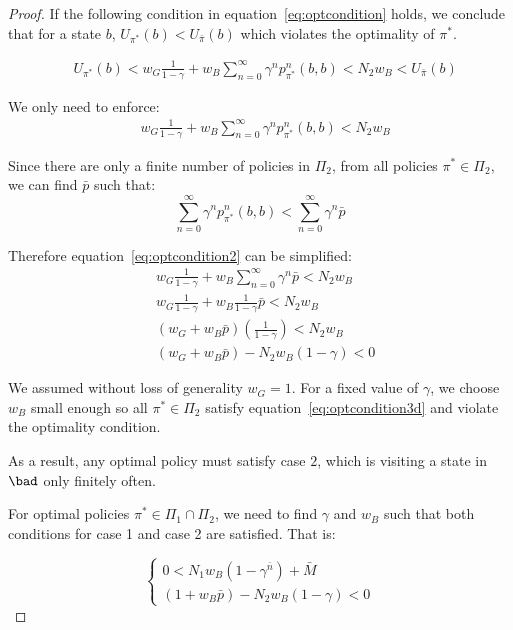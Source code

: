 \begin{proof}
If the following condition in equation~\eqref{eq:optcondition} holds, we conclude that for a state $b$,  $U_{\pi^*}(b) < U_{\bar{\pi}}(b)$ which violates the optimality of $\pi^*$.

\begin{align}
\label{eq:optcondition}
&U_{\pi^*}(b) <  w_G \frac{1}{1-\gamma}+ w_B\sum_{n=0}^\infty \gamma^n p_{\pi^*}^n(b,b) < N_2w_B <U_{\bar{\pi}}(b)
\end{align}

We only need to enforce:
\begin{align}
\label{eq:optcondition2}
&w_G\frac{1}{1-\gamma}  + w_B\sum_{n=0}^\infty \gamma^n p_{\pi^*}^n(b,b) < N_2w_B 
\end{align}

Since there are only a finite number of policies in $\Pi_2$, from all policies $\pi^* \in \Pi_2$, we can find $\bar{p}$ such that:
\begin{equation}
\sum_{n=0}^\infty \gamma^n p_{\pi^*}^n(b,b) < \sum_{n=0}^\infty \gamma^n \bar{p}
\end{equation}

Therefore equation~\eqref{eq:optcondition2} can be simplified:
\begin{align}
\label{eq:optcondition3}
&w_G \frac{1}{1-\gamma} + w_B \sum_{n=0}^\infty \gamma^n \bar{p} < N_2w_B\\
&w_G \frac{1}{1-\gamma} + w_B \frac{1}{1- \gamma}\bar{p} < N_2w_B \\
&(w_G + w_B \bar{p})(\frac{1}{1-\gamma}) < N_2 w_B \\
\label{eq:optcondition3d}
&(w_G + w_B \bar{p}) - N_2 w_B(1-\gamma) < 0
\end{align}



We assumed without loss of generality $w_G =1$. For a fixed value of $\gamma$, we choose $w_B$ small enough so all $\pi^* \in \Pi_2$ satisfy equation~\eqref{eq:optcondition3d} and violate the optimality condition.

As a result, any optimal policy must satisfy case $2$, which is visiting a state in $\bad$ only finitely often.

For optimal policies $\pi^* \in \Pi_1 \cap \Pi_2$, we need to find $\gamma$ and $w_B$ such that both conditions for case 1 and case 2 are satisfied. That is:

\begin{equation}
\label{eq:final}
\begin{cases}
0<N_1w_B ( 1-\gamma ^ {\bar n}) +  \bar{M} \\
(1 + w_B \bar{p}) - N_2 w_B(1-\gamma) < 0
\end{cases}
\end{equation}


\end{proof}
